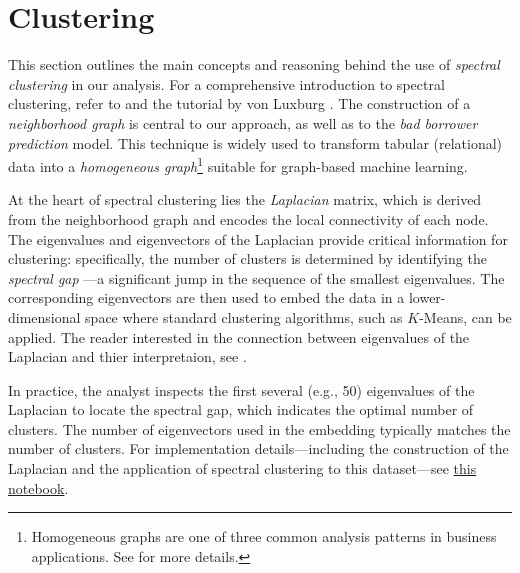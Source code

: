 \documentclass[12pt]{article}
\begin{document}
\section{Clustering}\label{sec:clustering}
This section outlines the main concepts and reasoning behind the use of \emph{spectral clustering} in our analysis. For a comprehensive introduction to spectral clustering, refer to \cite{stat_ml_spectral_graph_theory} and the tutorial by von Luxburg \cite{von2007tutorial}. The construction of a \emph{neighborhood graph} is central to our approach, as well as to the \emph{bad borrower prediction} model. This technique is widely used to transform tabular (relational) data into a \emph{homogeneous graph}\footnote{Homogeneous graphs are one of three common analysis patterns in business applications. See \cite{stat_ml_nbrh_graph} for more details.} suitable for graph-based machine learning.

At the heart of spectral clustering lies the \emph{Laplacian} matrix, which is derived from the neighborhood graph and encodes the local connectivity of each node. The eigenvalues and eigenvectors of the Laplacian provide critical information for clustering: specifically, the number of clusters is determined by identifying the \emph{spectral gap }—a significant jump in the sequence of the smallest eigenvalues. The corresponding eigenvectors are then used to embed the data in a lower-dimensional space where standard clustering algorithms, such as $K$-Means, can be applied. The reader interested in the connection between eigenvalues of the Laplacian and thier interpretaion, see \cite{marsden2013eigenvalues}.

In practice, the analyst inspects the first several (e.g., 50) eigenvalues of the Laplacian to locate the spectral gap, which indicates the optimal number of clusters. The number of eigenvectors used in the embedding typically matches the number of clusters. For implementation details—including the construction of the Laplacian and the application of spectral clustering to this dataset—see \href{https://github.com/rajivsam/descriptive_analytics/blob/main/notebooks/sba_cluster_featurization.ipynb}{this notebook}.
\end{document}
